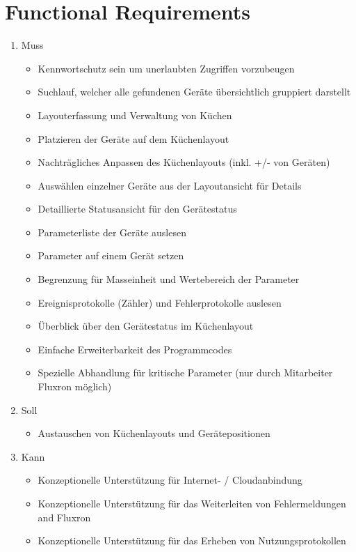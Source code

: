 
\section{Functional Requirements}
\label{sec:Functional Requirements}

\begin{enumerate}
\item Muss
	\begin{itemize}
		\item Kennwortschutz sein um unerlaubten Zugriffen vorzubeugen
        \item Suchlauf, welcher alle gefundenen Geräte übersichtlich gruppiert darstellt
        \item Layouterfassung und Verwaltung von Küchen
        \item Platzieren der Geräte auf dem Küchenlayout
        \item Nachträgliches Anpassen des Küchenlayouts (inkl. +/- von Geräten)
        \item Auswählen einzelner Geräte aus der Layoutansicht für Details
        \item Detaillierte Statusansicht für den Gerätestatus
        \item Parameterliste der Geräte auslesen
		\item Parameter auf einem Gerät setzen
		\item Begrenzung für Masseinheit und Wertebereich der Parameter
        \item Ereignisprotokolle (Zähler) und Fehlerprotokolle auslesen
        \item Überblick über den Gerätestatus im Küchenlayout
        \item Einfache Erweiterbarkeit des Programmcodes
        \item Spezielle Abhandlung für kritische Parameter (nur durch Mitarbeiter Fluxron möglich)
	\end{itemize}
\item Soll
	\begin{itemize}
        \item Austauschen von Küchenlayouts und Gerätepositionen
	\end{itemize}
\item Kann
	\begin{itemize}
		\item Konzeptionelle Unterstützung für Internet- / Cloudanbindung
        \item Konzeptionelle Unterstützung für das Weiterleiten von Fehlermeldungen and Fluxron
        \item Konzeptionelle Unterstützung für das Erheben von Nutzungsprotokollen
	\end{itemize}
\end{enumerate}